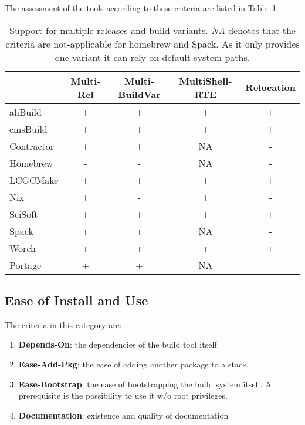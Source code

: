 \documentclass[12pt,a4paper]{article}
\begin{document}
The assessment of the tools according to these criteria are listed in Table~\ref{tab:taxonomyVariants}.

\begin{table}
\centering
\begin{tabular}{lcccc}
&Multi-Rel & Multi-BuildVar & MultiShell-RTE & Relocation \\ \hline
aliBuild & \cellcolor{green} +  & \cellcolor{green} + & \cellcolor{green} + & \cellcolor{green} + \\
cmsBuild & \cellcolor{green} +  & \cellcolor{green} + & \cellcolor{green} + & \cellcolor{green} + \\
Contractor & \cellcolor{green} + & \cellcolor{green} + & \cellcolor{yellow} NA  &  \cellcolor{red} - \\
Homebrew &  \cellcolor{red} - & \cellcolor{red} -   & \cellcolor{yellow} NA   & \cellcolor{red} -  \\
LCGCMake & \cellcolor{green} + & \cellcolor{green} + & \cellcolor{green} + & \cellcolor{green} +\\
Nix & \cellcolor{green} + & \cellcolor{red} - & \cellcolor{green} +  & \cellcolor{red} -\\
SciSoft &  \cellcolor{green} + & \cellcolor{green} + &  \cellcolor{green} + & \cellcolor{green} + \\
Spack & \cellcolor{green} + & \cellcolor{green} + & \cellcolor{yellow} NA & \cellcolor{red} -\\
Worch &  \cellcolor{green} + &  \cellcolor{green}  + &  \cellcolor{green} + &  \cellcolor{green} + \\
Portage & \cellcolor{green} + & \cellcolor{green} + & \cellcolor{yellow} NA & \cellcolor{red} -
\end{tabular}
\caption{\label{tab:taxonomyVariants}Support for multiple releases and build variants. \emph{NA} denotes that the criteria are not-applicable for homebrew and Spack. As it only provides one variant it can rely on default system paths.}
\end{table}

\subsection{Ease of Install and Use}
The criteria in this category are:
\begin{enumerate}
\item \textbf{Depends-On}: the dependencies of the build tool itself.
\item \textbf{Ease-Add-Pkg}: the ease of adding another package to a stack.
\item \textbf{Ease-Bootstrap}: the ease of bootstrapping the build system itself. A prerequisite is the possibility to use it w/o root privileges.
\item \textbf{Documentation}: existence and quality of documentation
\end{enumerate}
\end{document}
